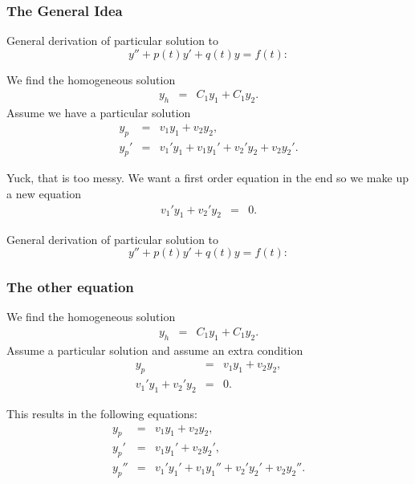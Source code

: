 \begin{frame}
  \frametitle{The General Idea}
  General derivation of particular solution to $$y''+p(t)y'+q(t)y=f(t):$$

  We find the homogeneous solution
  \begin{eqnarray*}
    y_h & = & C_1  y_1 + C_1 y_2.
  \end{eqnarray*}
  Assume we have a particular solution
  \begin{eqnarray*}
    y_p & = & v_1 y_1 + v_2 y_2, \\
    y_p' & = & v_1' y_1 + v_1 y_1' + v_2' y_2 + v_2 y_2'.
  \end{eqnarray*}

  Yuck, that is too messy. We want a first order equation in the end
  so {\color{red}we make up a new equation
  \begin{eqnarray}
    \label{eqn:firstConstraint}
    v_1' y_1 + v_2' y_2 & = & 0.
  \end{eqnarray}}

\end{frame}


\begin{frame}
General derivation of particular solution to $$y''+p(t)y'+q(t)y=f(t):$$
  \frametitle{The other equation}

  We find the homogeneous solution
  \begin{eqnarray*}
    y_h & = & C_1  y_1 + C_1 y_2.
  \end{eqnarray*}
  Assume  a particular solution and assume an extra condition
  \begin{eqnarray*}
    y_p & = & v_1 y_1 + v_2 y_2, \\
    v_1' y_1 + v_2' y_2 & = & 0.
  \end{eqnarray*}


  This results in the following equations:
  \begin{eqnarray*}
    y_p   & = & v_1 y_1 + v_2 y_2, \\
    y_p'  & = & v_1 y_1' + v_2 y_2', \\
    y_p'' & = & v_1' y_1' + v_1 y_1'' + v_2' y_2' + v_2 y_2''.
  \end{eqnarray*}


\end{frame}




